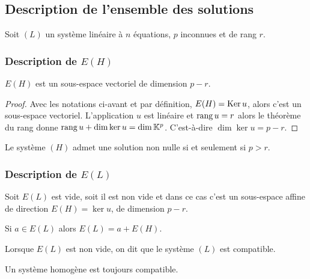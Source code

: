 \subsection{Description de l'ensemble des solutions}

Soit \((L)\) un système linéaire à \(n\) équations, \(p\) inconnues et de rang \(r\).

\subsubsection{Description de \(E(H)\)}

\begin{theo}
  \(E(H)\) est un sous-espace vectoriel de dimension \(p-r\).
\end{theo}
\begin{proof}
  Avec les notations ci-avant et par définition, \(E(H) = \operatorname{Ker} u\), alors c'est un sous-espace vectoriel. L'application \(u\) est linéaire et \(\operatorname{rang} u = r\) alors le théorème du rang donne \(\operatorname{rang} u +\dim \ker u = \dim \mathbb{K}^p\). C'est-à-dire \(\dim \ker u = p-r\).
\end{proof}
\begin{corth}
  Le système \((H)\) admet une solution non nulle si et seulement si \(p>r\).
\end{corth}

\subsubsection{Description de \(E(L)\)}

\begin{theo}
  Soit \(E(L)\) est vide, soit il est non vide et dans ce cas c'est un sous-espace affine de direction \(E(H) = \ker u\), de dimension \(p-r\).

  Si \(a \in E(L)\) alors \(E(L) = a+E(H)\).
\end{theo}
%
\begin{defdef}
  Lorsque \(E(L)\) est non vide, on dit que le système \((L)\) est compatible.
\end{defdef}
%
Un système homogène est toujours compatible.
%
